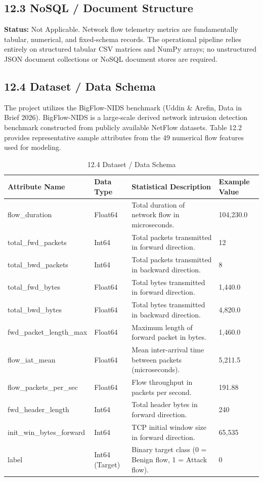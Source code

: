 \subsection{12.3 NoSQL / Document Structure}

\textbf{Status:} Not Applicable. Network flow telemetry metrics are fundamentally tabular, numerical, and fixed-schema records. The operational pipeline relies entirely on structured tabular CSV matrices and NumPy arrays; no unstructured JSON document collections or NoSQL document stores are required.

\subsection{12.4 Dataset / Data Schema}

The project utilizes the BigFlow-NIDS benchmark (Uddin \& Arefin, Data in Brief 2026). BigFlow-NIDS is a large-scale derived network intrusion detection benchmark constructed from publicly available NetFlow datasets. Table 12.2 provides representative sample attributes from the 49 numerical flow features used for modeling.

\begin{table}[H]
\centering
\small
\begin{tabular}{p{} p{} p{} p{}}
\toprule
\textbf{Attribute Name} & \textbf{Data Type} & \textbf{Statistical Description} & \textbf{Example Value} \\
\midrule
flow\_duration & Float64 & Total duration of network flow in microseconds. & 104,230.0 \\
total\_fwd\_packets & Int64 & Total packets transmitted in forward direction. & 12 \\
total\_bwd\_packets & Int64 & Total packets transmitted in backward direction. & 8 \\
total\_fwd\_bytes & Float64 & Total bytes transmitted in forward direction. & 1,440.0 \\
total\_bwd\_bytes & Float64 & Total bytes transmitted in backward direction. & 4,820.0 \\
fwd\_packet\_length\_max & Float64 & Maximum length of forward packet in bytes. & 1,460.0 \\
flow\_iat\_mean & Float64 & Mean inter-arrival time between packets (microseconds). & 5,211.5 \\
flow\_packets\_per\_sec & Float64 & Flow throughput in packets per second. & 191.88 \\
fwd\_header\_length & Int64 & Total header bytes in forward direction. & 240 \\
init\_win\_bytes\_forward & Int64 & TCP initial window size in forward direction. & 65,535 \\
label & Int64 (Target) & Binary target class (0 = Benign flow, 1 = Attack flow). & 0 \\
\bottomrule
\end{tabular}
\caption{12.4 Dataset / Data Schema}
\end{table}

